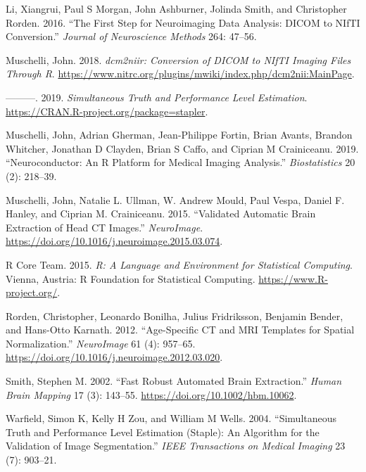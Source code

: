 \documentclass[]{elsarticle} %
\newlength{\cslhangindent}
\newenvironment{cslreferences}%
  {\setlength{\parindent}{0pt}%
  \everypar{\setlength{\hangindent}{\cslhangindent}}\ignorespaces}%
  {\par}
\begin{document}
\begin{cslreferences}
\leavevmode\hypertarget{ref-dcm2niix}{}%
Li, Xiangrui, Paul S Morgan, John Ashburner, Jolinda Smith, and Christopher Rorden. 2016. ``The First Step for Neuroimaging Data Analysis: DICOM to NIfTI Conversion.'' \emph{Journal of Neuroscience Methods} 264: 47--56.

\leavevmode\hypertarget{ref-dcm2niir}{}%
Muschelli, John. 2018. \emph{dcm2niir: Conversion of DICOM to NIfTI Imaging Files Through R}. \url{https://www.nitrc.org/plugins/mwiki/index.php/dcm2nii:MainPage}.

\leavevmode\hypertarget{ref-stapler}{}%
---------. 2019. \emph{Simultaneous Truth and Performance Level Estimation}. \url{https://CRAN.R-project.org/package=stapler}.

\leavevmode\hypertarget{ref-neuroconductor}{}%
Muschelli, John, Adrian Gherman, Jean-Philippe Fortin, Brian Avants, Brandon Whitcher, Jonathan D Clayden, Brian S Caffo, and Ciprian M Crainiceanu. 2019. ``Neuroconductor: An R Platform for Medical Imaging Analysis.'' \emph{Biostatistics} 20 (2): 218--39.

\leavevmode\hypertarget{ref-muschelli_validated_2015}{}%
Muschelli, John, Natalie L. Ullman, W. Andrew Mould, Paul Vespa, Daniel F. Hanley, and Ciprian M. Crainiceanu. 2015. ``Validated Automatic Brain Extraction of Head CT Images.'' \emph{NeuroImage}. \url{https://doi.org/10.1016/j.neuroimage.2015.03.074}.

\leavevmode\hypertarget{ref-RCORE}{}%
R Core Team. 2015. \emph{R: A Language and Environment for Statistical Computing}. Vienna, Austria: R Foundation for Statistical Computing. \url{https://www.R-project.org/}.

\leavevmode\hypertarget{ref-rorden_age-specific_2012}{}%
Rorden, Christopher, Leonardo Bonilha, Julius Fridriksson, Benjamin Bender, and Hans-Otto Karnath. 2012. ``Age-Specific CT and MRI Templates for Spatial Normalization.'' \emph{NeuroImage} 61 (4): 957--65. \url{https://doi.org/10.1016/j.neuroimage.2012.03.020}.

\leavevmode\hypertarget{ref-smith_fast_2002}{}%
Smith, Stephen M. 2002. ``Fast Robust Automated Brain Extraction.'' \emph{Human Brain Mapping} 17 (3): 143--55. \url{https://doi.org/10.1002/hbm.10062}.

\leavevmode\hypertarget{ref-warfield2004simultaneous}{}%
Warfield, Simon K, Kelly H Zou, and William M Wells. 2004. ``Simultaneous Truth and Performance Level Estimation (Staple): An Algorithm for the Validation of Image Segmentation.'' \emph{IEEE Transactions on Medical Imaging} 23 (7): 903--21.
\end{cslreferences}
\end{document}
